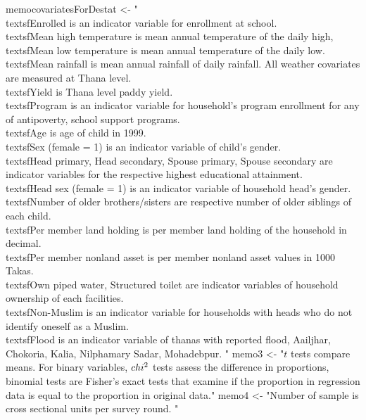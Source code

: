 \begin{Schunk}
\begin{Sinput}
memocovariatesForDestat <- "\\textsf{Enrolled} is an indicator variable for enrollment at school. \\textsf{Mean high temperature} is mean annual temperature of the daily high, \\textsf{Mean low temperature} is mean annual temperature of the daily low. \\textsf{Mean rainfall} is mean annual rainfall of daily rainfall. All weather covariates are measured at Thana level. \\textsf{Yield} is Thana level paddy yield. \\textsf{Program} is an indicator variable for household's program enrollment for any of antipoverty, school support programs. \\textsf{Age} is age of child in 1999.  \\textsf{Sex (female = 1)} is an indicator variable of child's gender. \\textsf{Head primary, Head secondary, Spouse primary, Spouse secondary} are indicator variables for the respective highest educational attainment. \\textsf{Head sex (female = 1)} is an indicator variable of household head's gender. \\textsf{Number of older brothers/sisters} are respective number of older siblings of each child. \\textsf{Per member land holding} is per member land holding of the household in decimal. \\textsf{Per member nonland asset} is per member nonland asset values in 1000 Takas. \\textsf{Own piped water, Structured toilet} are indicator variables of household ownership of each facilities. \\textsf{Non-Muslim} is an indicator variable for households with heads who do not identify oneself as a Muslim. \\textsf{Flood} is an indicator variable of thanas with reported flood, Aailjhar,  Chokoria, Kalia, Nilphamary Sadar, Mohadebpur. "
memo3 <- "$t$ tests compare means. For binary variables, $\\chi^{2}$ tests assess the difference in proportions, binomial tests are Fisher's exact tests that examine if the proportion in regression data is equal to the proportion in original data."
memo4 <- "Number of sample is cross sectional units per survey round. "
\end{Sinput}
\end{Schunk}

